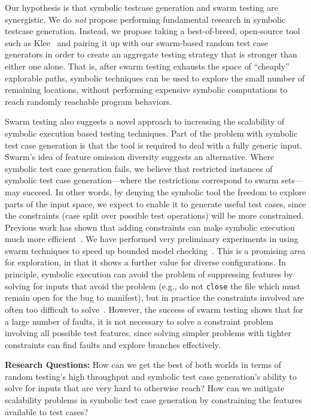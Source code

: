 Our hypothesis is that symbolic testcase generation and swarm
testing are synergistic.
%
We do \emph{not} propose performing fundamental research in 
symbolic testcase generation.
%
Instead, we propose taking a best-of-breed, open-source tool such as
Klee~\cite{KLEE} and pairing it up with our swarm-based random test
case generators in order to create an aggregate testing strategy that
is stronger than either one alone.  That is, after swarm testing
exhausts the space of ``cheaply'' explorable paths, symbolic
techniques can be used to explore the small number of remaining
locations, without performing expensive symbolic computations to reach
randomly reachable program behaviors.


Swarm testing also suggests a novel approach to increasing the
scalability of symbolic execution based testing techniques.  Part of
the problem with symbolic test case generation is that the tool is
required to deal with a fully generic input.
%
Swarm's idea of feature omission diversity suggests an alternative.
%
Where symbolic test case generation fails, we believe that restricted
instances of symbolic test case generation---where the restrictions
correspond to swarm sets---may succeed.
%
In other words, by denying the symbolic tool the freedom to explore
parts of the input space, we expect to enable it to generate useful
test cases, since the constraints (case split over possible test
operations) will be more constrained.  Previous work has shown that
adding constraints can make symbolic execution much more
efficient~\cite{exploit}.  We have performed very preliminary
experiments in using swarm techniques to speed up bounded model
checking~\cite{FeatureOmission}.  This is a promising area for
exploration, in that it shows a further value for diverse
configurations.  In principle, symbolic execution can avoid the
problem of suppressing features by solving for inputs that avoid the
problem (e.g., do not {\tt close} the file which must remain open for
the bug to manifest), but in practice the constraints involved are
often too difficult to solve~\cite{CFV08}.  However, the success of
swarm testing shows that for a large number of faults, it is not
necessary to solve a constraint problem involving all possible test
features, since solving simpler problems with tighter constraints can
find faults and explore branches effectively.

\begin{framed}
  \textbf{Research Questions:} How can we get the best of both worlds
  in terms of random testing's high throughput and symbolic test case
  generation's ability to solve for inputs that are very hard to
  otherwise reach?
%
  How can we mitigate scalability problems in symbolic test case
  generation by constraining the features available to test cases?
\end{framed}



